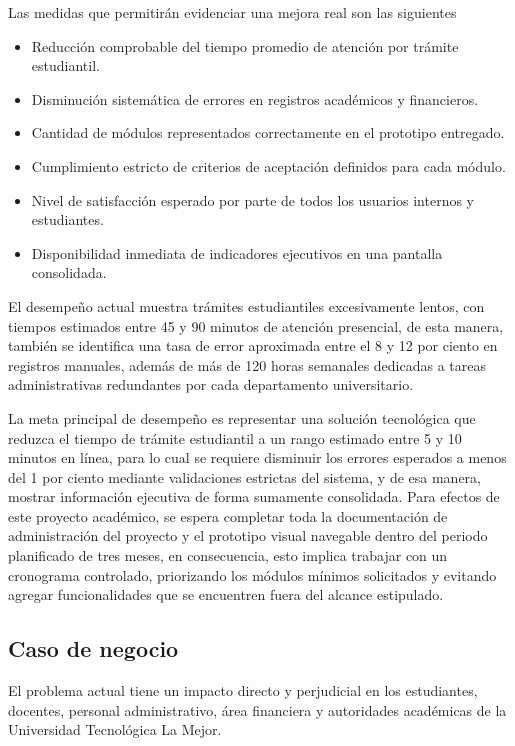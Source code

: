 \documentclass[11pt,spanish]{article}
\begin{document}
Las medidas que permitirán evidenciar una mejora real son las siguientes

\begin{itemize}
    \item Reducción comprobable del tiempo promedio de atención por trámite estudiantil.
    \item Disminución sistemática de errores en registros académicos y financieros.
    \item Cantidad de módulos representados correctamente en el prototipo entregado.
    \item Cumplimiento estricto de criterios de aceptación definidos para cada módulo.
    \item Nivel de satisfacción esperado por parte de todos los usuarios internos y estudiantes.
    \item Disponibilidad inmediata de indicadores ejecutivos en una pantalla consolidada.
\end{itemize}

El desempeño actual muestra trámites estudiantiles excesivamente lentos, con tiempos estimados entre 45 y 90 minutos de atención presencial, de esta manera, también se identifica una tasa de error aproximada entre el 8 y 12 por ciento en registros manuales, además de más de 120 horas semanales dedicadas a tareas administrativas redundantes por cada departamento universitario.

La meta principal de desempeño es representar una solución tecnológica que reduzca el tiempo de trámite estudiantil a un rango estimado entre 5 y 10 minutos en línea, para lo cual se requiere disminuir los errores esperados a menos del 1 por ciento mediante validaciones estrictas del sistema, y de esa manera, mostrar información ejecutiva de forma sumamente consolidada. Para efectos de este proyecto académico, se espera completar toda la documentación de administración del proyecto y el prototipo visual navegable dentro del periodo planificado de tres meses, en consecuencia, esto implica trabajar con un cronograma controlado, priorizando los módulos mínimos solicitados y evitando agregar funcionalidades que se encuentren fuera del alcance estipulado.

\subsection{Caso de negocio}

El problema actual tiene un impacto directo y perjudicial en los estudiantes, docentes, personal administrativo, área financiera y autoridades académicas de la Universidad Tecnológica La Mejor.
\end{document}
